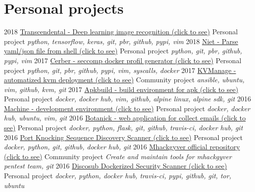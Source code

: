 \documentclass[]{friggeri-cv}
\begin{document}
\newpage

\section{Personal projects}
\begin{entrylist}
    \entry
        {2018}
        {\href{https://github.com/4383/transcendental}{Transcendental - Deep learning image recognition (click to see)}}
        {Personal project}
        {\emph{python, tensorflow, keras, git, pbr, github, pypi, vim}}
    \entry
        {2018}
        {\href{https://github.com/gr0und-s3ct0r/niet}{Niet - Parse yaml/json file from shell (click to see)}}
        {Personal project}
        {\emph{python, git, pbr, github, pypi, vim}}
    \entry
        {2017}
        {\href{https://github.com/gr0und-s3ct0r/cerber}{Cerber - seccomp docker profil generator (click to see)}}
        {Personal project}
        {\emph{python, git, pbr, github, pypi, vim, syscalls, docker}}
    \entry
        {2017}
        {\href{https://github.com/sweet-sinatra/kvmanage/}{KVManage - automatized kvm deployment (click to see)}}
        {Community project}
        {\emph{ansible, ubuntu, vim, github, kvm, git}}
    \entry
        {2017}
        {\href{https://github.com/gr0und-s3ct0r/apkbuild}{Apkbuild - build environment for apk (click to see)}}
        {Personal project}
        {\emph{docker, docker hub, vim, github, alpine linux, alpine sdk, git}}
    \entry
        {2016}
        {\href{https://github.com/4383/machine}{Machine - development environment (click to see)}}
        {Personal project}
        {\emph{docker, docker hub, ubuntu, vim, git}}
    \entry
        {2016}
        {\href{https://github.com/4383/Botanick}{Botanick - web application for collect emails (click to see)}}
        {Personal project}
        {\emph{docker, python, flask, git, github, travis-ci, docker hub, git}}
    \entry
        {2016}
        {\href{https://github.com/mhackgyver-squad/porno-king}{Port Knocking Sequence Discovery Scanner (click to see)}}
        {Personal project}
        {\emph{docker, python, git, github, docker hub, git}}
    \entry
        {2016}
        {\href{https://github.com/mhackgyver-squad/mhackgyver}{Mhackgyver official repository (click to see)}}
        {Community project}
        {\emph{Create and maintain tools for mhackgyver pentest team, git}}
    \entry
        {2016}
        {\href{https://hub.docker.com/r/4383/discosub}{Discosub Dockerized Security Scanner (click to see)}}
        {Personal project}
        {\emph{docker, python, docker hub, travis-ci, pypi, github, git, tor, ubuntu}}

\end{entrylist}
\end{document}
